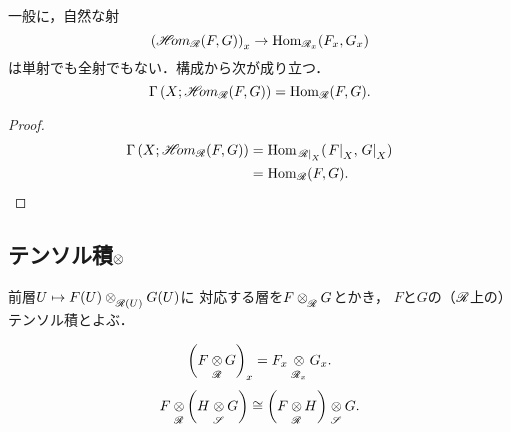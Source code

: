 一般に，自然な射
\begin{equation}
    \left(\HOM_{\scR}(F,G)\right)_{x}
    \to
    \Hom_{\scR_{x}}(F_{x},G_{x})
\end{equation}
は単射でも全射でもない．構成から次が成り立つ．
\begin{equation}
    \Gamma\left(X;\HOM_{\scR}(F,G)\right)
    =\Hom_{\scR}(F,G).
\end{equation}
\begin{proof}
    \begin{align*}
        \Gamma\left(X;\HOM_{\scR}(F,G)\right)
        &=\Hom_{\mres[\scR]{X}}(\mres[F]{X},\mres[G]{X})\\    
        &=\Hom_{\scR}(F,G).    
    \end{align*}        
\end{proof}

\subsection*{テンソル積\(\ttens\)}
\begin{leftbar}
    \begin{DFN}
        前層\(U\mapsto F(U)\ttens[\scR(U)]G(U)\)に
        対応する層を\(F\ttens[\scR]G\)とかき，
        \(F\)と\(G\)の（\(\scR\)上の）テンソル積とよぶ．
    \end{DFN}    
\end{leftbar}

\begin{equation}
    \left(F\ttens[\scR]G\right)_x
    =F_x\ttens[\scR_x]G_x.
\end{equation}
\begin{equation}
    F\ttens[\scR]\left(H\ttens[\scS]G\right)
    \cong
    \left(F\ttens[\scR]H\right)\ttens[\scS]G.
\end{equation}

